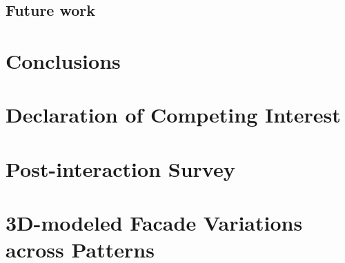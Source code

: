 \documentclass[final,5p,times]{elsarticle}%
\begin{document}
\begin{linenumbers}

    \subsection{Future work}
    \label{subsec:Future_work}
    


\section{Conclusions}
\label{sec:Conclusion}



\section{Declaration of Competing Interest}
\label{sec:DeclarationInterest}


%

\end{linenumbers}




\newpage
\appendix


\section{Post-interaction Survey}
\label{sec:Annexsurvey}


\section{3D-modeled Facade Variations across Patterns}
\label{sec:AnnexVariations}

\end{document}
